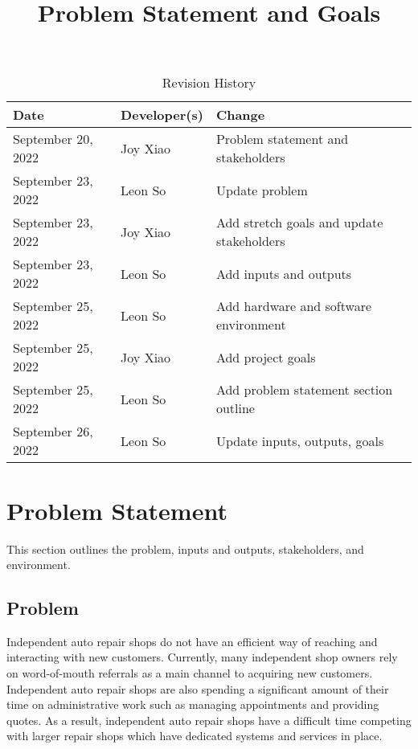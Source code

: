 \documentclass{article}
\title{Problem Statement and Goals\\\progname}
\author{\authname}
\date{}
\begin{document}
\maketitle

\begin{table}[hp]
	\caption{Revision History} \label{TblRevisionHistory}
	\begin{tabularx}{\textwidth}{llX}
		\toprule
		\textbf{Date}      & \textbf{Developer(s)} & \textbf{Change}                           \\
		\midrule
		September 20, 2022 & Joy Xiao              & Problem statement and stakeholders        \\
		September 23, 2022 & Leon So               & Update problem                            \\
		September 23, 2022 & Joy Xiao              & Add stretch goals and update stakeholders \\
		September 23, 2022 & Leon So               & Add inputs and outputs                    \\
		September 25, 2022 & Leon So               & Add hardware and software environment     \\
		September 25, 2022 & Joy Xiao              & Add project goals                         \\
		September 25, 2022 & Leon So               & Add problem statement section outline     \\
		September 26, 2022 & Leon So               & Update inputs, outputs, goals             \\
		\bottomrule
	\end{tabularx}
\end{table}

\section{Problem Statement}
This section outlines the problem, inputs and outputs, stakeholders, and environment.

\subsection{Problem}
Independent auto repair shops do not have an efficient way of reaching and interacting with new
customers. Currently, many independent shop owners rely on word-of-mouth referrals as a main
channel to acquiring new customers. Independent auto repair shops are also spending a significant
amount of their time on administrative work such as managing appointments and providing quotes. As
a result, independent auto repair shops have a difficult time competing with larger repair shops
which have dedicated systems and services in place.\\
\end{document}
